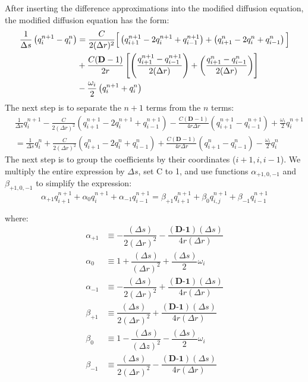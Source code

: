 \documentclass[11pt]{article} %
\begin{document}
\noindent
After inserting the difference approximations into the modified diffusion equation, the modified diffusion equation has the form:
\begin{align}
\frac{1}{\Delta s} \left(q_{i}^{n+1} - q_{i}^n \right) &=  \frac{C}{2(\Delta r)^2} \textbf{\Big[} \left( q_{i+1}^{n+1} -2q_{i}^{n+1} + q_{i-1}^{n+1} \right)+\left( q_{i+1}^{n} -2q_{i}^{n} + q_{i-1}^{n} \right) \textbf{\Big]} \\ 
&+  \frac{C (\textbf{D}-1)}{2r} \left[\left(\frac{q_{i+1}^{n+1} - q_{i-1}^{n+1}}{2(\Delta r)} \right)+ \left(\frac{q_{i+1}^{n} - q_{i-1}^{n}}{2(\Delta r)} \right) \right] \\
&-\frac{\omega_i}{2} \left(q_i^{n+1}+q_i^n \right)
\end{align}
\noindent
The next step is to separate the $n+1$ terms from the $n$ terms:
\begin{align}
&\frac{1}{\Delta s}q_{i}^{n+1}  - \frac{C}{2(\Delta r)^2} \left( q_{i+1}^{n+1} -2q_{i}^{n+1} + q_{i-1}^{n+1} \right) - \frac{C(\textbf{D}-1)}{4r\Delta r} \left( q_{i+1}^{n+1} - q_{i-1}^{n+1} \right)  + \frac{\omega_{i}}{2}  q_{i}^{n+1} \\
& = \frac{1}{\Delta s} q_{i}^n  + \frac{C}{2(\Delta r)^2} \left( q_{i+1}^{n} -2q_{i}^{n} + q_{i-1}^{n} \right) + \frac{C(\textbf{D}-1)}{4r\Delta r} \left( q_{i+1}^{n} - q_{i-1}^{n} \right) - \frac{\omega_{i}}{2} q_{i}^{n} 
\end{align}
\noindent
The next step is to group the coefficients by their coordinates ($i+1,i,i-1$). We multiply the entire expression by $\Delta s$, set C to 1, and use functions $\alpha_{+1,0,-1}$ and $\beta_{+1,0,-1}$ to simplify the expression:
\begin{equation}
\alpha_{+1} q_{i+1}^{n+1} + \alpha_0 q_{i}^{n+1} + \alpha_{-1} q_{i-1}^{n+1} = \beta_{+1} q_{i+1}^{n+1} + \beta_0 q_{i,j}^{n+1} + \beta_{-1} q_{i-1}^{n+1}
\end{equation}

\noindent
where:
\begin{align}
\alpha_{+1} &\equiv - \dfrac{ (\Delta s)}{2(\Delta r)^2} - \dfrac{(\textbf{D-1}) (\Delta s)}{4r(\Delta r)} \\
\alpha_0 &\equiv 1 + \dfrac{(\Delta s)}{(\Delta r)^2} + \dfrac{(\Delta s)}{2} \omega_{i} \\
\alpha_{-1}  &\equiv -  \dfrac{ (\Delta s)}{2(\Delta r)^2} + \dfrac{(\textbf{D-1}) (\Delta s)}{4r(\Delta r)} \\
\beta_{+1}  &\equiv  \dfrac{ (\Delta s)}{2(\Delta r)^2} + \dfrac{(\textbf{D-1}) (\Delta s)}{4r(\Delta r)} \\
\beta_0  &\equiv 1 - \dfrac{ (\Delta s)}{(\Delta z)^2} - \dfrac{(\Delta s)}{2} \omega_{i} \\
\beta_{-1}  &\equiv  \dfrac{ (\Delta s)}{2(\Delta r)^2} - \dfrac{(\textbf{D-1}) (\Delta s)}{4r(\Delta r)} 
\end{align} \\[12pt]
\end{document}
